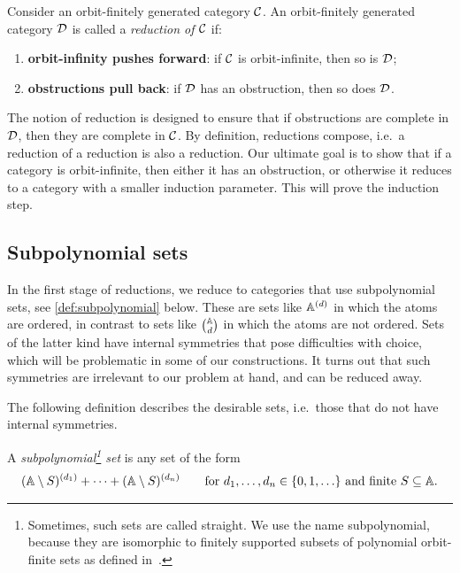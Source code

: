 \begin{definition}
    Consider an orbit-finitely generated category ${\mathcal C}$. An orbit-finitely generated  category ${\mathcal D}$ is called a \emph{reduction of ${\mathcal C}$} if:
    \begin{enumerate}
          \item \label{item:reduction-orbinf} \textbf{orbit-infinity pushes forward}: if ${\mathcal C}$ is orbit-infinite, then so is ${\mathcal D}$;
        \item\label{item:reduction-obstruction} \textbf{obstructions pull back}: if ${\mathcal D}$ has an obstruction, then so does ${\mathcal D}$.
    \end{enumerate}
\end{definition}

The notion of reduction is designed to ensure that if obstructions are complete in ${\mathcal D}$, then they are complete in ${\mathcal C}$. 
By definition, reductions compose, i.e.~a reduction of a reduction is also a reduction. Our ultimate goal is to show that if a category is orbit-infinite, then either it has an obstruction, or otherwise it reduces to a category with a smaller induction parameter. This will prove the induction step. 


\subsection{Subpolynomial sets}
\label{sec:subpolynomial}
In the first stage of reductions, we reduce to categories that use subpolynomial sets, see \cref{def:subpolynomial} below. These are sets like $\mathbb A^{(d)}$ in which the atoms are ordered, in contrast to sets like $\mathbb A \choose d$ in which the atoms are not ordered.  Sets of the latter kind have internal symmetries that pose difficulties with choice, which will be problematic in some of our constructions.  It turns out that such symmetries are irrelevant to our problem at hand, and can be reduced away. 


The following definition describes the desirable sets, i.e.~those that do not have internal symmetries. 
\begin{definition}
    \label{def:subpolynomial}
    A \emph{subpolynomial\footnote{Sometimes, such sets are called straight. We use the name subpolynomial, because they are isomorphic to finitely supported subsets of polynomial orbit-finite sets as defined in~\cite[Section 1]{bojanczyk_slightly2018}.} set}  is any set of the form
    \begin{align*}
    (\mathbb A \setminus S)^{(d_1)} + \cdots + (\mathbb A \setminus S)^{(d_n)} \qquad \text{for $d_1,\ldots,d_n \in \{0,1,\ldots\}$ and finite $S \subseteq \mathbb A$.}
    \end{align*}
\end{definition}

